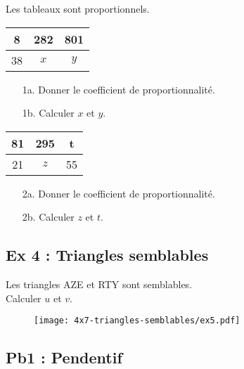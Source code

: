Les tableaux sont proportionnels. 

\begin{multicols}{2}
\begin{center}
  \begin{tabular}{|c|c|c|}
    \hline
    8 & 282 & 801 \\  \hline
    38 & $x$ & $y$\\  \hline
  \end{tabular}
\end{center}

\begin{enumerate}
  \item[1a.] Donner le coefficient de proportionnalité.
  \item[1b.] Calculer $x$ et $y$.
  \end{enumerate}

\begin{center}
  \begin{tabular}{|c|c|c|}
    \hline
    81 & 295 & t \\  \hline
    21 & $z$ & 55\\  \hline
  \end{tabular}
\end{center}

\begin{enumerate}
  \item[2a.] Donner le coefficient de proportionnalité.
  \item[2b.] Calculer $z$ et $t$.
  \end{enumerate}
\end{multicols}

\Pointilles[8]

\newpage

\begin{multicols}{2}
\subsection*{Ex 4 : Triangles semblables}

Les triangles AZE et RTY sont semblables.\\ Calculer $u$ et $v$. 

\begin{figure}[H]
  \centering
  \texttt{[image: 4x7-triangles-semblables/ex5.pdf]}
\end{figure}
\end{multicols} 

\Pointilles[5]

\subsection*{Pb1 : Pendentif} 

